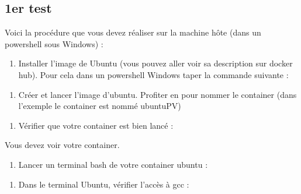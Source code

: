 \documentclass[french, 12pt]{article}%
\begin{document}
\subsection{1er test}


Voici la procédure que vous devez réaliser sur la machine hôte (dans un powershell sous Windows) : 
\begin{enumerate}
\item Installer l'image de Ubuntu (vous pouvez aller voir sa description sur docker hub). Pour cela dans un powershell Windows taper la commande suivante : 
\end{enumerate}


\begin{enumerate}[resume]
\item Créer et lancer l'image d'ubuntu. Profiter en pour nommer le container (dans l'exemple le container est nommé ubuntuPV)
\end{enumerate}

 
 \begin{enumerate}[resume]
\item Vérifier que votre container est bien lancé : 
\end{enumerate}


Vous devez voir votre container.

\begin{enumerate}[resume]
\item Lancer un terminal bash de votre container ubuntu : 
\end{enumerate}


 
 
\begin{enumerate}[resume]
\item Dans le terminal Ubuntu, vérifier l'accès à gcc : 
\end{enumerate}
\end{document}
